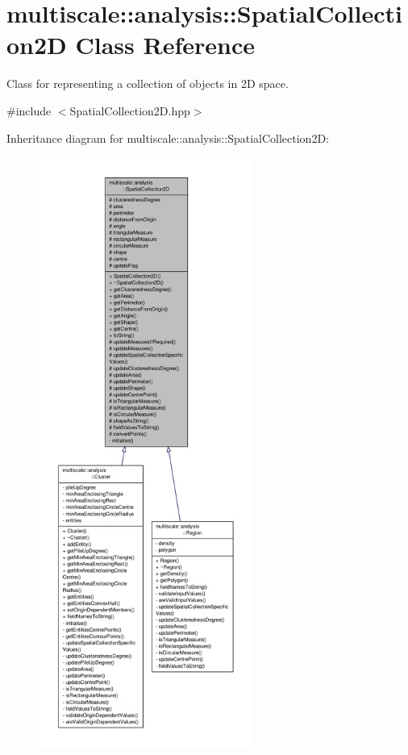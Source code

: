 \hypertarget{classmultiscale_1_1analysis_1_1SpatialCollection2D}{\section{multiscale\-:\-:analysis\-:\-:Spatial\-Collection2\-D Class Reference}
\label{classmultiscale_1_1analysis_1_1SpatialCollection2D}
}


Class for representing a collection of objects in 2\-D space.  




{\ttfamily \#include $<$Spatial\-Collection2\-D.\-hpp$>$}



Inheritance diagram for multiscale\-:\-:analysis\-:\-:Spatial\-Collection2\-D\-:
\nopagebreak
\begin{figure}[H]
\begin{center}
\leavevmode
\includegraphics[height=550pt]{classmultiscale_1_1analysis_1_1SpatialCollection2D__inherit__graph}
\end{center}
\end{figure}


